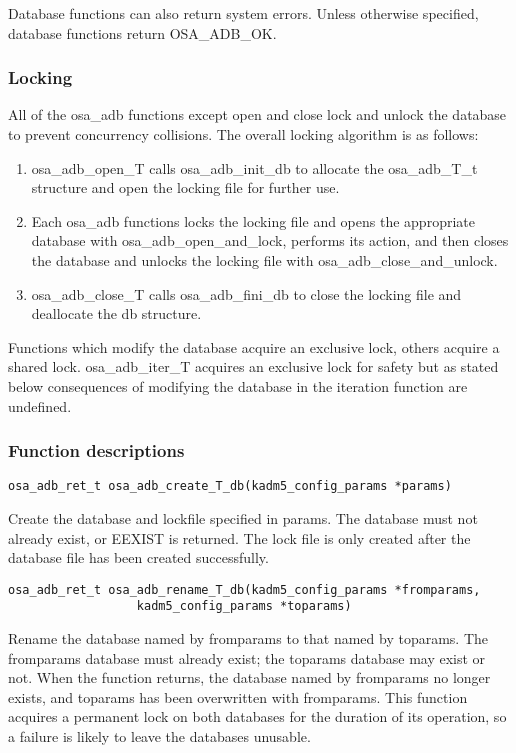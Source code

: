 Database functions can also return system errors.  Unless otherwise
specified, database functions return OSA_ADB_OK.

\subsubsection{Locking}

All of the osa_adb functions except open and close lock and unlock the
database to prevent concurrency collisions.  The overall locking
algorithm is as follows:

\begin{enumerate}
\item osa_adb_open_T calls osa_adb_init_db to allocate the osa_adb_T_t
structure and open the locking file for further use.

\item Each osa_adb functions locks the locking file and opens the
appropriate database with osa_adb_open_and_lock, performs its action,
and then closes the database and unlocks the locking file with
osa_adb_close_and_unlock.

\item osa_adb_close_T calls osa_adb_fini_db to close the locking file
and deallocate the db structure.
\end{enumerate}

Functions which modify the database acquire an exclusive lock, others
acquire a shared lock.  osa_adb_iter_T acquires an exclusive lock for
safety but as stated below consequences of modifying the database in
the iteration function are undefined.

\subsubsection{Function descriptions}

\begin{verbatim}
osa_adb_ret_t osa_adb_create_T_db(kadm5_config_params *params)
\end{verbatim}
%
Create the database and lockfile specified in params.  The database
must not already exist, or EEXIST is returned.  The lock file is only
created after the database file has been created successfully.

\begin{verbatim}
osa_adb_ret_t osa_adb_rename_T_db(kadm5_config_params *fromparams,
				  kadm5_config_params *toparams)
\end{verbatim}
%
Rename the database named by fromparams to that named by toparams.
The fromparams database must already exist; the toparams database may
exist or not.  When the function returns, the database named by
fromparams no longer exists, and toparams has been overwritten with
fromparams.  This function acquires a permanent lock on both databases
for the duration of its operation, so a failure is likely to leave the
databases unusable.

